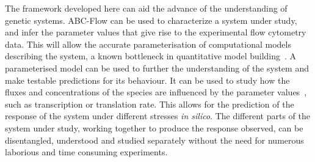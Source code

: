 



The framework developed here can aid the advance of the understanding of genetic systems. ABC-Flow can be used to characterize a system under study, and infer the parameter values that give rise to the experimental flow cytometry data. This will allow the accurate parameterisation of computational models describing the system, a known bottleneck in quantitative model building~\autocite{LeNovere:2015dp}. A parameterised model can be used to further the understanding of the system and make testable predictions for its behaviour. It can be used to study how the fluxes and concentrations of the species are influenced by the parameter values~\autocite{Li:2010kt}, such as transcription or translation rate. This allows for the prediction of the response of the system under different stresses \textit{in silico}. The different parts of the system under study, working together to produce the response observed, can be disentangled, understood and studied separately without the need for numerous laborious and time consuming experiments. 


